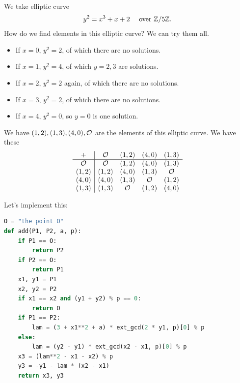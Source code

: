 \begin{example}
    We take elliptic curve
    \[y^2 = x^3 + x + 2\quad \text{ over }\mathbb Z/5\mathbb Z.\]
    How do we find elements in this elliptic curve? We can try them all.
    \begin{itemize}
        \item If $x = 0$, $y^2 = 2$, of which there are no solutions.
        \item If $x = 1$, $y^2 = 4$, of which $y = 2, 3$ are solutions.
        \item If $x = 2$, $y^2 = 2$ again, of which there are no solutions.
        \item If $x = 3$, $y^2 = 2$, of which there are no solutions.
        \item If $x = 4$, $y^2 = 0$, so $y = 0$ is one solution.
    \end{itemize}
    We have $(1,2), (1,3), (4,0), \mathcal{O}$ are the elements of this elliptic curve. We have these
    \[\begin{array}{c|cccc}
            +     & \mathcal{O}   & (1,2) & (4,0) & (1,3) \\ \hline
            \mathcal{O}   & \mathcal{O}   & (1,2) & (4,0) & (1,3) \\
            (1,2) & (1,2) & (4,0) & (1,3) & \mathcal{O}   \\
            (4,0) & (4,0) & (1,3) & \mathcal{O}   & (1,2) \\
            (1,3) & (1,3) & \mathcal{O}   & (1,2) & (4,0)
        \end{array}\]
\end{example}
Let's implement this:
\begin{lstlisting}[language=Python]
O = "the point O"
def add(P1, P2, a, p):
    if P1 == O:
        return P2
    if P2 == O:
        return P1
    x1, y1 = P1
    x2, y2 = P2
    if x1 == x2 and (y1 + y2) % p == 0:
        return O
    if P1 == P2:
        lam = (3 + x1**2 + a) * ext_gcd(2 * y1, p)[0] % p
    else:
        lam = (y2 - y1) * ext_gcd(x2 - x1, p)[0] % p
    x3 = (lam**2 - x1 - x2) % p
    y3 = -y1 - lam * (x2 - x1)
    return x3, y3
\end{lstlisting}